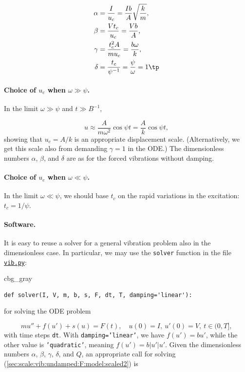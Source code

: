 \documentclass[graybox,envcountchap,sectrefs,final]{svmonodo}
\newenvironment{_cod_tight}[1]{
   \def\FrameCommand{\colorbox{#1}}
   \FrameRule0.6pt\MakeFramed {\FrameRestore}\vskip3mm}
   {\vskip0mm\endMakeFramed}
\newenvironment{cod}[1]{
\bgroup\rmfamily
\fboxsep=0mm\relax
\begin{_cod_tight}{#1}
\list{}{\parsep=-2mm\parskip=0mm\topsep=0pt\leftmargin=2mm
\rightmargin=2\leftmargin\leftmargin=4pt\relax}
\item\relax}
{\endlist\end{_cod_tight}\egroup}
\begin{document}

\begin{align}
\alpha &= \frac{I}{u_c} = \frac{Ib}{A}\sqrt{\frac{k}{m}},\\ 
\beta  &= \frac{Vt_c}{u_c} = \frac{Vb}{A},\\ 
\gamma &= \frac{t_c^2 A}{mu_c} = \frac{b\omega}{k},\\ 
\delta &= \frac{t_c}{\psi^{-1}} = \frac{\psi}{\omega} = 1\tp
\end{align}

\paragraph{Choice of $u_c$ when $\omega\gg\psi$.}
In the limit $\omega\gg\psi$ and $t\gg B^{-1}$,

\[ u \approx \frac{A}{m\omega^2}\cos\psi t = \frac{A}{k}\cos\psi t,\]
showing that $u_c=A/k$ is an appropriate displacement scale.
(Alternatively, we get this scale also from demanding $\gamma=1$ in the ODE.)
The dimensionless numbers $\alpha$, $\beta$, and $\delta$ are as
for the forced vibrations without damping.

\paragraph{Choice of $u_c$ when $\omega\ll\psi$.}
In the limit $\omega\ll\psi$, we should base $t_c$ on the rapid
variations in the excitation: $t_c=1/\psi$.

\paragraph{Software.}
It is easy to reuse a solver for a general vibration problem also
in the dimensionless case.
In particular, we may use the \texttt{solver} function in the
file \href{{http://tinyurl.com/o8pb3yy/vib.py}}{\nolinkurl{vib.py}}:

\begin{cod}{cbg_gray}\begin{Verbatim}[numbers=none,fontsize=\fontsize{9pt}{9pt},baselinestretch=0.95,xleftmargin=2mm]
def solver(I, V, m, b, s, F, dt, T, damping='linear'):
\end{Verbatim}
\end{cod}
\noindent
for solving the ODE problem

\[ mu'' + f(u') + s(u) = F(t),\quad u(0)=I,\ u'(0)=V,\ t\in (0,T],\]
with time steps \texttt{dt}. With \texttt{damping='linear'}, we have $f(u')=bu'$, while the
other value is \texttt{'quadratic'}, meaning $f(u')=b|u'|u'$.
Given the dimensionless numbers $\alpha$, $\beta$, $\gamma$, $\delta$,
and $Q$,
an appropriate call for solving (\ref{sec:scale:vib:undamped:F:model:scaled2}) is
\end{document}
